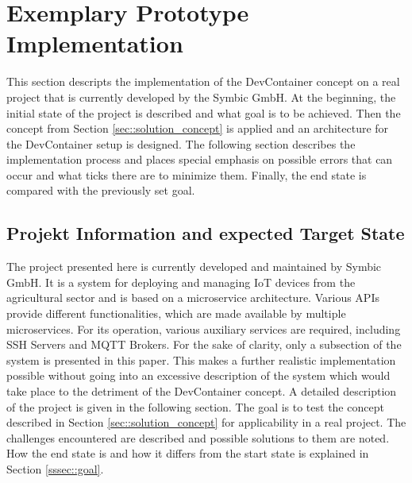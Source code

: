 
\section{Exemplary Prototype Implementation}\label{sec::solution_code}
This section descripts the implementation of the DevContainer concept on a real project that is currently developed by the Symbic GmbH. At the beginning, the initial state of the project is described and what goal is to be achieved. Then the concept from Section \ref{sec::solution_concept} is applied and an architecture for the DevContainer setup is designed. The following section describes the implementation process and places special emphasis on possible errors that can occur and what ticks there are to minimize them. Finally, the end state is compared with the previously set goal.

    \subsection{Projekt Information and expected Target State}
    The project presented here is currently developed and maintained by Symbic GmbH. It is a system for deploying and managing \ac{IoT} devices from the agricultural sector and is based on a microservice architecture. Various \ac{API}s provide different functionalities, which are made available by multiple microservices. For its operation, various auxiliary services are required, including SSH Servers and MQTT Brokers. For the sake of clarity, only a subsection of the system is presented in this paper. This makes a further realistic implementation possible without going into an excessive description of the system which would take place to the detriment of the DevContainer concept. A detailed description of the project is given in the following section. \newline
    The goal is to test the concept described in Section \ref{sec::solution_concept} for applicability in a real project. The challenges encountered are described and possible solutions to them are noted. How the end state is and how it differs from the start state is explained in Section \ref{sssec::goal}.

